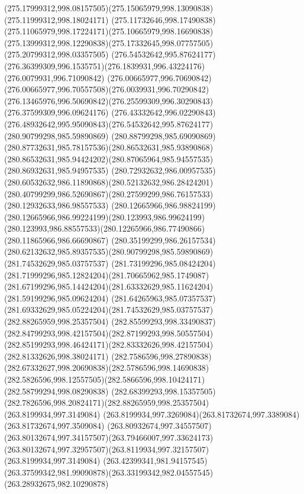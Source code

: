 {    \curveto(275.17999312,998.08157505)(275.15065979,998.13090838)(275.11999312,998.18024171)
    \curveto(275.11732646,998.17490838)(275.11065979,998.17224171)(275.10665979,998.16690838)
    \curveto(275.13999312,998.12290838)(275.17332645,998.07757505)(275.20799312,998.03357505)
    \moveto(276.54532642,995.87624177)
    \curveto(276.36399309,996.1535751)(276.1839931,996.43224176)(276.0079931,996.71090842)
    \curveto(276.00665977,996.70690842)(276.00665977,996.70557508)(276.0039931,996.70290842)
    \curveto(276.13465976,996.50690842)(276.25599309,996.30290843)(276.37599309,996.09624176)
    \curveto(276.43332642,996.02290843)(276.48932642,995.95090843)(276.54532642,995.87624177)
    \moveto(280.90799298,985.59890869)
    \curveto(280.88799298,985.69090869)(280.87732631,985.78157536)(280.86532631,985.93890868)
    \curveto(280.86532631,985.94424202)(280.87065964,985.94557535)(280.86932631,985.94957535)
    \curveto(280.72932632,986.00957535)(280.60532632,986.11890868)(280.52132632,986.28424201)
    \curveto(280.40799299,986.52690867)(280.27599299,986.76157533)(280.12932633,986.98557533)
    \curveto(280.12665966,986.98824199)(280.12665966,986.99224199)(280.123993,986.99624199)
    \curveto(280.123993,986.88557533)(280.12265966,986.77490866)(280.11865966,986.66690867)
    \curveto(280.35199299,986.26157534)(280.62132632,985.89357535)(280.90799298,985.59890869)
    \moveto(281.74532629,985.03757537)
    \curveto(281.73199296,985.08424204)(281.71999296,985.12824204)(281.70665962,985.1749087)
    \curveto(281.67199296,985.14424204)(281.63332629,985.11624204)(281.59199296,985.09624204)
    \curveto(281.64265963,985.07357537)(281.69332629,985.05224204)(281.74532629,985.03757537)
    \moveto(282.88265959,998.25357504)
    \curveto(282.85599293,998.33490837)(282.84799293,998.42157504)(282.87199293,998.50557504)
    \curveto(282.85199293,998.46424171)(282.83332626,998.42157504)(282.81332626,998.38024171)
    \curveto(282.7586596,998.27890838)(282.67332627,998.20690838)(282.5786596,998.14690838)
    \curveto(282.5826596,998.12557505)(282.5866596,998.10424171)(282.58799294,998.08290838)
    \curveto(282.68399293,998.15357505)(282.7826596,998.20824171)(282.88265959,998.25357504)
    \moveto(263.8199934,997.3149084)
    \curveto(263.8199934,997.3269084)(263.81732674,997.3389084)(263.81732674,997.3509084)
    \curveto(263.80932674,997.34557507)(263.80132674,997.34157507)(263.79466007,997.33624173)
    \curveto(263.80132674,997.32957507)(263.8119934,997.32157507)(263.8199934,997.3149084)
    \moveto(263.42399341,981.94157545)
    \curveto(263.37599342,981.99090878)(263.33199342,982.04557545)(263.28932675,982.10290878)
}
